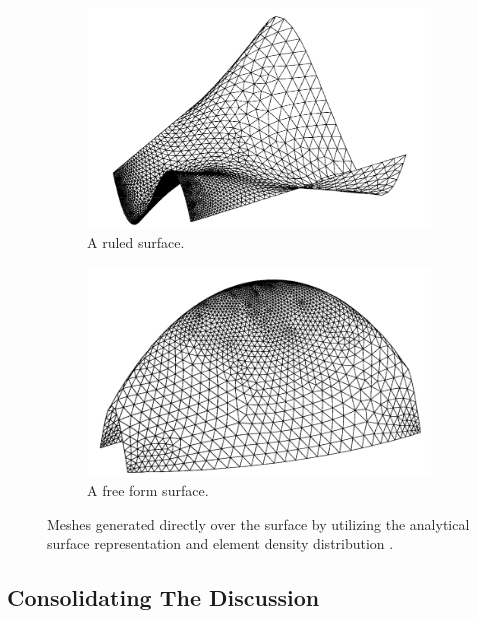 \begin{figure}
	\centering
	\begin{subfigure}{0.5\linewidth}
		\centering
		\includegraphics[width=\linewidth]{img/intro/lit/lu1.png}
		\caption{A ruled surface.}
		\label{fig-lu1}
	\end{subfigure}
	\begin{subfigure}{0.5\linewidth}
		\centering
		\includegraphics[width=\linewidth]{img/intro/lit/lu2.png}
		\caption{A free form surface.}
		\label{fig-lu2}
	\end{subfigure}
	\caption{Meshes generated directly over the surface by utilizing the analytical surface representation and element density distribution \cite{lan1996finite}.}
	\label{fig-lu}
\end{figure}


\subsection{Consolidating The Discussion}

